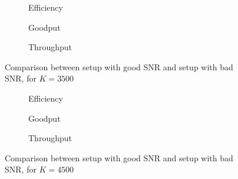 \begin{figure}[t]
\centering
\begin{subfigure}{0.23\textwidth}
	\captionsetup{justification=centering,font=scriptsize}
	\centering
	\setlength\fwidth{\textwidth}
	\setlength{}
	
	\caption{Efficiency}
	\label{fig:wifi_eff_lsnr_3500}
\end{subfigure}\hspace{2em}%
\begin{subfigure}{0.23\textwidth}
	\captionsetup{justification=centering,font=scriptsize}
	\centering
	\setlength\fwidth{\textwidth}
	\setlength{}
	
	\caption{Goodput}
	\label{fig:wifi_good_lsnr_3500}
\end{subfigure}\hspace{2em}%
\begin{subfigure}{0.23\textwidth}
	\captionsetup{justification=centering,font=scriptsize}
	\centering
	\setlength\fwidth{\textwidth}
	\setlength{}
	
	\caption{Throughput}
	\label{fig:wifi_thr_lsnr_3500}
\end{subfigure}
\caption{Comparison between setup with good SNR and setup with bad SNR, for $K=3500$}
\label{fig:wifi_lsnr_3500}
\end{figure}
\begin{figure}[t]
\centering
\begin{subfigure}{0.23\textwidth}
	\captionsetup{justification=centering,font=scriptsize}
	\centering
	\setlength\fwidth{\textwidth}
	\setlength{}
	
	\caption{Efficiency}
	\label{fig:wifi_eff_lsnr_4500}
\end{subfigure}\hspace{2em}%
\begin{subfigure}{0.23\textwidth}
	\captionsetup{justification=centering,font=scriptsize}
	\centering
	\setlength\fwidth{\textwidth}
	\setlength{}
	
	\caption{Goodput}
	\label{fig:wifi_good_lsnr_4500}
\end{subfigure}\hspace{2em}%
\begin{subfigure}{0.23\textwidth}
	\captionsetup{justification=centering,font=scriptsize}
	\centering
	\setlength\fwidth{\textwidth}
	\setlength{}
	
	\caption{Throughput}
	\label{fig:wifi_thr_lsnr_4500}
\end{subfigure}
\caption{Comparison between setup with good SNR and setup with bad SNR, for $K=4500$}
\label{fig:wifi_lsnr_4500}
\end{figure}

